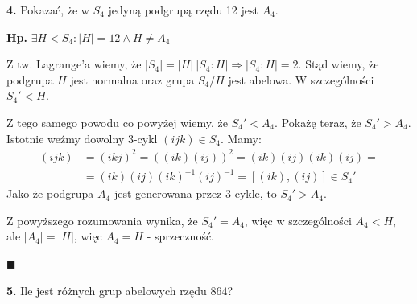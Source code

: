 \documentclass{article}
\begin{document}
\begin{center}
\Large{\textbf{4.} Pokazać, że w $S_4$ jedyną podgrupą rzędu 12 jest $A_4$. }
\end{center}
\normalsize{}
\begin{center}
\textbf{Hp.} $\exists H<S_4:|H|=12 \wedge H\neq A_4$
\end{center}
Z tw. Lagrange'a wiemy, że $|S_4|=|H|\ |S_4:H| \Rightarrow |S_4:H|=2$. Stąd wiemy, że podgrupa $H$ jest normalna oraz grupa $S_4/H $ jest abelowa. W szczególności $S_4'<H$.

Z tego samego powodu co powyżej wiemy, że $S_4'<A_4$. Pokażę teraz, że $S_4'>A_4$. Istotnie weźmy dowolny 3-cykl $(ijk)\in S_4$. Mamy:
\begin{align*}
    (ijk)& =(ikj)^2=((ik)(ij))^2=(ik)(ij)(ik)(ij)=\\
    & =(ik)(ij)(ik)^{-1}(ij)^{-1}=[(ik),(ij)]\in S_4'
\end{align*}
Jako że podgrupa $A_4$ jest generowana przez 3-cykle, to $S_4'>A_4$. 

Z powyższego rozumowania wynika, że $S_4'=A_4$, więc w szczególności $A_4<H$, ale $|A_4|=|H|$, więc $A_4=H$ - sprzeczność.
\begin{flushright}
$\blacksquare$
\end{flushright}

\begin{center}
\Large \textbf{5.} Ile jest różnych grup abelowych rzędu $864$?
\end{center}
\normalsize{}
\end{document}
